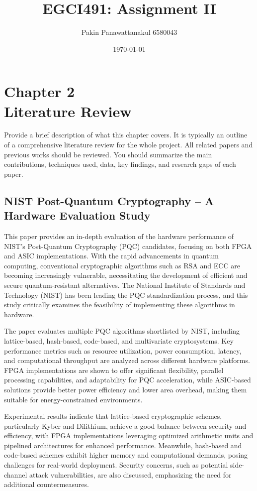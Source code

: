 \documentclass[a4paper, 12pt]{report}
\title{EGCI491: Assignment II}
\author{Pakin Panawattanakul 6580043} %
\date{\today}
\begin{document}
	
	\maketitle
	
	\chapter*{\centering Chapter 2 \\  Literature Review}
	
	\hspace{\parindent} 
	Provide a brief description of what this chapter covers. It is typically an outline of a comprehensive literature review for the whole project.  All related papers and previous works should be reviewed. You should summarize the main contributions, techniques used, data, key findings, and research gaps of each paper.
	
	\setcounter{chapter}{2}
	\section{NIST Post-Quantum Cryptography – A Hardware Evaluation Study \cite{paper_2}}
	This paper provides an in-depth evaluation of the hardware performance of NIST’s Post-Quantum Cryptography (PQC) candidates, focusing on both FPGA and ASIC implementations. With the rapid advancements in quantum computing, conventional cryptographic algorithms such as RSA and ECC are becoming increasingly vulnerable, necessitating the development of efficient and secure quantum-resistant alternatives. The National Institute of Standards and Technology (NIST) has been leading the PQC standardization process, and this study critically examines the feasibility of implementing these algorithms in hardware.
	
	The paper evaluates multiple PQC algorithms shortlisted by NIST, including lattice-based, hash-based, code-based, and multivariate cryptosystems. Key performance metrics such as resource utilization, power consumption, latency, and computational throughput are analyzed across different hardware platforms. FPGA implementations are shown to offer significant flexibility, parallel processing capabilities, and adaptability for PQC acceleration, while ASIC-based solutions provide better power efficiency and lower area overhead, making them suitable for energy-constrained environments.
	
	Experimental results indicate that lattice-based cryptographic schemes, particularly Kyber and Dilithium, achieve a good balance between security and efficiency, with FPGA implementations leveraging optimized arithmetic units and pipelined architectures for enhanced performance. Meanwhile, hash-based and code-based schemes exhibit higher memory and computational demands, posing challenges for real-world deployment. Security concerns, such as potential side-channel attack vulnerabilities, are also discussed, emphasizing the need for additional countermeasures.
	
\end{document}
